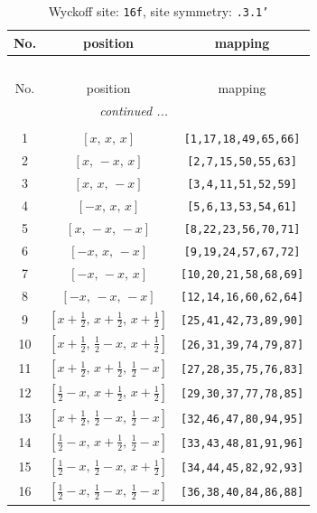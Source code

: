\documentclass[fleqn,8pt]{jsarticle}
\begin{document}
\begin{longtable}{ccc}
\caption{Wyckoff site: {\tt 16f}, site symmetry: {\tt .3.1'}}
 \\
 \hline \hline
No. & position & mapping \\ \hline \endfirsthead

\multicolumn{2}{l}{\tablename\ \thetable{}} \\
 \hline \hline
No. & position & mapping \\ \hline \endhead

 \hline \hline
\multicolumn{2}{r}{\footnotesize\it continued ...} \\ \endfoot

 \hline \hline
\multicolumn{2}{r}{} \\ \endlastfoot

1 & $\left[ x,\, x,\, x \right]$ & {\tt [1,17,18,49,65,66]} \\ \hline
2 & $\left[ x,\, - x,\, x \right]$ & {\tt [2,7,15,50,55,63]} \\ \hline
3 & $\left[ x,\, x,\, - x \right]$ & {\tt [3,4,11,51,52,59]} \\ \hline
4 & $\left[ - x,\, x,\, x \right]$ & {\tt [5,6,13,53,54,61]} \\ \hline
5 & $\left[ x,\, - x,\, - x \right]$ & {\tt [8,22,23,56,70,71]} \\ \hline
6 & $\left[ - x,\, x,\, - x \right]$ & {\tt [9,19,24,57,67,72]} \\ \hline
7 & $\left[ - x,\, - x,\, x \right]$ & {\tt [10,20,21,58,68,69]} \\ \hline
8 & $\left[ - x,\, - x,\, - x \right]$ & {\tt [12,14,16,60,62,64]} \\ \hline
9 & $\left[ x + \frac{1}{2},\, x + \frac{1}{2},\, x + \frac{1}{2} \right]$ & {\tt [25,41,42,73,89,90]} \\ \hline
10 & $\left[ x + \frac{1}{2},\, \frac{1}{2} - x,\, x + \frac{1}{2} \right]$ & {\tt [26,31,39,74,79,87]} \\ \hline
11 & $\left[ x + \frac{1}{2},\, x + \frac{1}{2},\, \frac{1}{2} - x \right]$ & {\tt [27,28,35,75,76,83]} \\ \hline
12 & $\left[ \frac{1}{2} - x,\, x + \frac{1}{2},\, x + \frac{1}{2} \right]$ & {\tt [29,30,37,77,78,85]} \\ \hline
13 & $\left[ x + \frac{1}{2},\, \frac{1}{2} - x,\, \frac{1}{2} - x \right]$ & {\tt [32,46,47,80,94,95]} \\ \hline
14 & $\left[ \frac{1}{2} - x,\, x + \frac{1}{2},\, \frac{1}{2} - x \right]$ & {\tt [33,43,48,81,91,96]} \\ \hline
15 & $\left[ \frac{1}{2} - x,\, \frac{1}{2} - x,\, x + \frac{1}{2} \right]$ & {\tt [34,44,45,82,92,93]} \\ \hline
16 & $\left[ \frac{1}{2} - x,\, \frac{1}{2} - x,\, \frac{1}{2} - x \right]$ & {\tt [36,38,40,84,86,88]} \\
\end{longtable}
\end{document}
